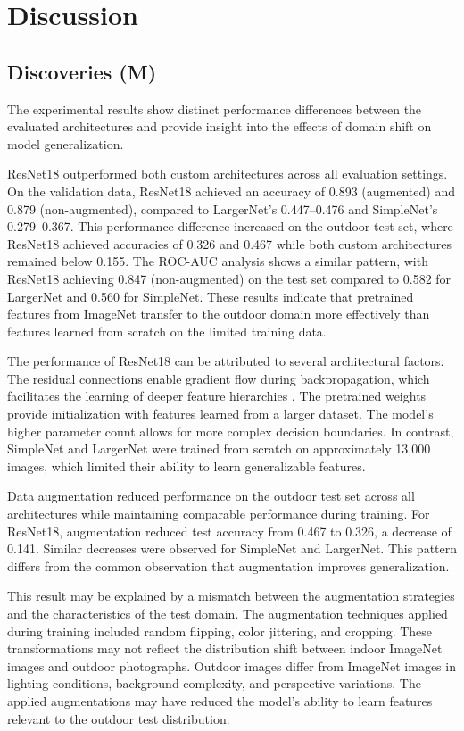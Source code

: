 \documentclass[a4paper]{article}
\begin{document}
\section{Discussion}
\subsection{Discoveries (M)}
The experimental results show distinct performance differences between the evaluated architectures and provide insight into the effects of domain shift on model generalization.

ResNet18 outperformed both custom architectures across all evaluation settings. On the validation data, ResNet18 achieved an accuracy of 0.893 (augmented) and 0.879 (non-augmented), compared to LargerNet's 0.447--0.476 and SimpleNet's 0.279--0.367. This performance difference increased on the outdoor test set, where ResNet18 achieved accuracies of 0.326 and 0.467 while both custom architectures remained below 0.155. The ROC-AUC analysis shows a similar pattern, with ResNet18 achieving 0.847 (non-augmented) on the test set compared to 0.582 for LargerNet and 0.560 for SimpleNet. These results indicate that pretrained features from ImageNet transfer to the outdoor domain more effectively than features learned from scratch on the limited training data.

The performance of ResNet18 can be attributed to several architectural factors. The residual connections enable gradient flow during backpropagation, which facilitates the learning of deeper feature hierarchies \citep{liang2020image}. The pretrained weights provide initialization with features learned from a larger dataset. The model's higher parameter count allows for more complex decision boundaries. In contrast, SimpleNet and LargerNet were trained from scratch on approximately 13,000 images, which limited their ability to learn generalizable features.

Data augmentation reduced performance on the outdoor test set across all architectures while maintaining comparable performance during training. For ResNet18, augmentation reduced test accuracy from 0.467 to 0.326, a decrease of 0.141. Similar decreases were observed for SimpleNet and LargerNet. This pattern differs from the common observation that augmentation improves generalization.

This result may be explained by a mismatch between the augmentation strategies and the characteristics of the test domain. The augmentation techniques applied during training included random flipping, color jittering, and cropping. These transformations may not reflect the distribution shift between indoor ImageNet images and outdoor photographs. Outdoor images differ from ImageNet images in lighting conditions, background complexity, and perspective variations. The applied augmentations may have reduced the model's ability to learn features relevant to the outdoor test distribution.
\end{document}
